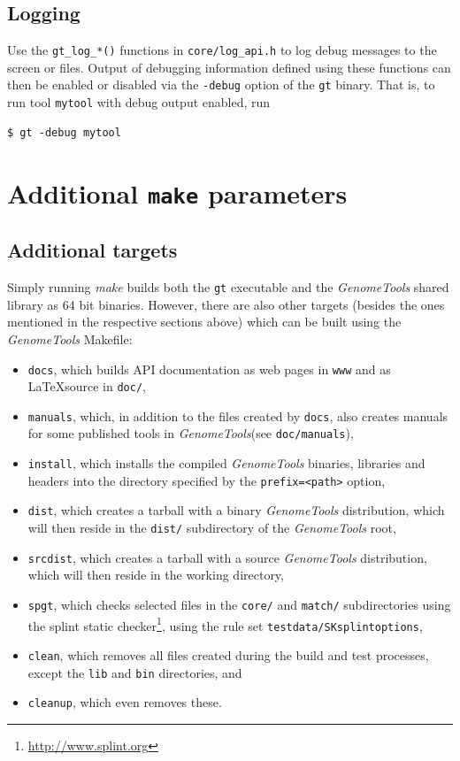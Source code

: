 \documentclass[11pt,final]{article}
\newcommand{\keyword}[1]{\lstinline{#1}}
\newcommand{\Gt}[0]{\emph{GenomeTools}\xspace}
\begin{document}
\subsection{Logging}

Use the \keyword{gt_log_*()} functions in \keyword{core/log_api.h} to log debug
messages to the screen or files. Output of debugging information defined using
these functions can then be enabled or disabled via the \keyword{-debug} option
of the \keyword{gt} binary. That is, to run tool \keyword{mytool} with debug
output enabled, run

\begin{lstlisting}
$ gt -debug mytool
\end{lstlisting}%

\section{Additional \keyword{make} parameters}

\subsection{Additional targets}
Simply running \emph{make} builds both the \keyword{gt} executable and the
\Gt shared library as 64 bit binaries. However, there are also other targets
(besides the ones mentioned in the respective sections above) which can be
built using the \Gt Makefile:
\begin{itemize}
\item
\keyword{docs}, which builds API documentation as web pages in \keyword{www} and
as \LaTeX\@ source in \keyword{doc/},
\item
\keyword{manuals}, which, in addition to the files created by \keyword{docs},
also creates manuals for some published tools in \Gt (see
\keyword{doc/manuals}),
\item
\keyword{install}, which installs the compiled \Gt binaries, libraries and
headers into the directory specified by the \keyword{prefix=<path>} option,
\item
\keyword{dist}, which creates a tarball with a binary \Gt distribution, which
will then reside in the \keyword{dist/} subdirectory of the \Gt root,
\item
\keyword{srcdist}, which creates a tarball with a source \Gt distribution, which
will then reside in the working directory,
\item
\keyword{spgt}, which checks selected files in the \keyword{core/} and
\keyword{match/} subdirectories using the splint static
checker\footnote{\url{http://www.splint.org}}, using the rule set
\keyword{testdata/SKsplintoptions},
\item
\keyword{clean}, which removes all files created during the build and test
processes, except the \keyword{lib} and \keyword{bin} directories, and
\item
\keyword{cleanup}, which even removes these.
\end{itemize}
\end{document}
